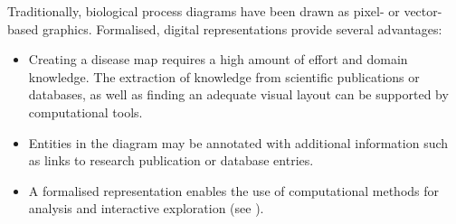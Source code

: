 \documentclass[
	fontsize=10pt, %
	twoside=true, %
	secnumdepth=1, %
  toc=indentunnumbered %
]{kaobook}
\begin{document}
Traditionally, biological process diagrams have been drawn as pixel- or
vector-based graphics. Formalised, digital representations provide several
advantages:
\begin{itemize}
\item Creating a disease map requires a high amount of effort and domain
  knowledge. The extraction of knowledge from scientific publications or
  databases, as well as finding an adequate visual layout can be supported by
  computational tools.
\item Entities in the diagram may be annotated with additional information
  such as links to research publication or database entries.
\item A formalised representation enables the use of computational methods for
  analysis and interactive exploration (see ).
\end{itemize}
\end{document}
